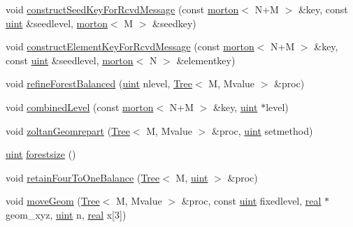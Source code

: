 \begin{DoxyCompactItemize}
\item 
void \mbox{\hyperlink{classForest_a2269d0888420a7d167a120919c83eff0}{construct\+Seed\+Key\+For\+Rcvd\+Message}} (const \mbox{\hyperlink{definitions_8h_af8682350bd8bb38ee9023f7a0a310add}{morton}}$<$ N+M $>$ \&key, const \mbox{\hyperlink{definitions_8h_a69aa29b598b851b0640aa225a9e5d61d}{uint}} \&seedlevel, \mbox{\hyperlink{definitions_8h_af8682350bd8bb38ee9023f7a0a310add}{morton}}$<$ M $>$ \&seedkey)
\item 
void \mbox{\hyperlink{classForest_a36659b1ce85c0da6ea9e0c6abbfcd939}{construct\+Element\+Key\+For\+Rcvd\+Message}} (const \mbox{\hyperlink{definitions_8h_af8682350bd8bb38ee9023f7a0a310add}{morton}}$<$ N+M $>$ \&key, const \mbox{\hyperlink{definitions_8h_a69aa29b598b851b0640aa225a9e5d61d}{uint}} \&seedlevel, \mbox{\hyperlink{definitions_8h_af8682350bd8bb38ee9023f7a0a310add}{morton}}$<$ N $>$ \&elementkey)
\item 
void \mbox{\hyperlink{classForest_a65086c4cc28f331b64770e5fa78d5f56}{refine\+Forest\+Balanced}} (\mbox{\hyperlink{definitions_8h_a69aa29b598b851b0640aa225a9e5d61d}{uint}} nlevel, \mbox{\hyperlink{classTree}{Tree}}$<$ M, Mvalue $>$ \&proc)
\item 
void \mbox{\hyperlink{classForest_ad1e3944cb7ce12ad68b32016fc46eb8a}{combined\+Level}} (const \mbox{\hyperlink{definitions_8h_af8682350bd8bb38ee9023f7a0a310add}{morton}}$<$ N+M $>$ \&key, \mbox{\hyperlink{definitions_8h_a69aa29b598b851b0640aa225a9e5d61d}{uint}} $\ast$level)
\item 
void \mbox{\hyperlink{classForest_ad3d1881090df317c7e9b3afb700b3842}{zoltan\+Geomrepart}} (\mbox{\hyperlink{classTree}{Tree}}$<$ M, Mvalue $>$ \&proc, \mbox{\hyperlink{definitions_8h_a69aa29b598b851b0640aa225a9e5d61d}{uint}} setmethod)
\item 
\mbox{\hyperlink{definitions_8h_a69aa29b598b851b0640aa225a9e5d61d}{uint}} \mbox{\hyperlink{classForest_a0de3c18eb1d25d45fff90e1ea2c96eaf}{forestsize}} ()
\item 
void \mbox{\hyperlink{classForest_a2c547cde298d9665e3ef791a43f13abe}{retain\+Four\+To\+One\+Balance}} (\mbox{\hyperlink{classTree}{Tree}}$<$ M, \mbox{\hyperlink{definitions_8h_a69aa29b598b851b0640aa225a9e5d61d}{uint}} $>$ \&proc)
\item 
void \mbox{\hyperlink{classForest_a74688a7a09b343125d95df9d46960632}{move\+Geom}} (\mbox{\hyperlink{classTree}{Tree}}$<$ M, Mvalue $>$ \&proc, const \mbox{\hyperlink{definitions_8h_a69aa29b598b851b0640aa225a9e5d61d}{uint}} fixedlevel, \mbox{\hyperlink{definitions_8h_aedc0ad84d1e764530814f57ad931d02a}{real}} $\ast$geom\+\_\+xyz, \mbox{\hyperlink{definitions_8h_a69aa29b598b851b0640aa225a9e5d61d}{uint}} n, \mbox{\hyperlink{definitions_8h_aedc0ad84d1e764530814f57ad931d02a}{real}} x\mbox{[}3\mbox{]})

\end{DoxyCompactItemize}
